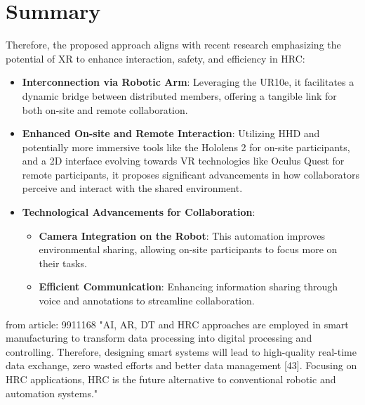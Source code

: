 

\section{Summary}
Therefore, the proposed approach aligns with recent research emphasizing the potential of \ac{XR} to enhance interaction, safety, and efficiency 
in \ac{HRC}:
\begin{itemize}
    \item \textbf{Interconnection via Robotic Arm}: Leveraging the UR10e, it facilitates a dynamic bridge between distributed members, offering a 
    tangible link for both on-site and remote collaboration.

    \item \textbf{Enhanced On-site and Remote Interaction}: Utilizing \ac{HHD} and potentially more immersive tools like the Hololens 2 for on-site 
    participants, and a 2D interface evolving towards \ac{VR} technologies like Oculus Quest for remote participants, it proposes significant advancements 
    in how collaborators perceive and interact with the shared environment.

    \item \textbf{Technological Advancements for Collaboration}:
    \begin{itemize}
        \item \textbf{Camera Integration on the Robot}: This automation improves environmental sharing, allowing on-site participants to focus more 
        on their tasks. 
        \item \textbf{Efficient Communication}: Enhancing information sharing through voice and annotations to streamline collaboration.
    \end{itemize}
\end{itemize}


from article: 9911168
"AI, AR, DT and HRC approaches are employed in smart manufacturing to transform data processing into digital processing and controlling. 
Therefore, designing smart systems will lead to high-quality real-time data exchange, zero wasted efforts and better data management [43]. 
Focusing on HRC applications, HRC is the future alternative to conventional robotic and automation systems."

